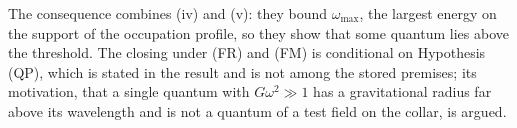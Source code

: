 The consequence combines (iv) and (v): they bound $\omega_{\max}$, the largest energy on the support of the occupation profile, so they show that some quantum lies above the threshold. The closing under (FR) and (FM) is conditional on Hypothesis (QP), which is stated in the result and is not among the stored premises; its motivation, that a single quantum with $G\omega^{2} \gg 1$ has a gravitational radius far above its wavelength and is not a quantum of a test field on the collar, is argued.
